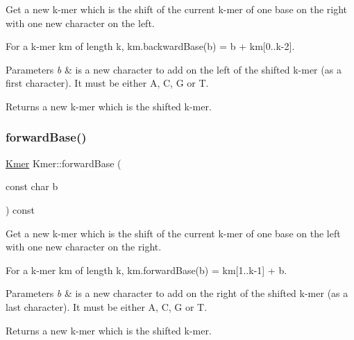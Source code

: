 Get a new k-\/mer which is the shift of the current k-\/mer of one base on the right with one new character on the left. 

For a k-\/mer km of length k, km.\+backward\+Base(b) = b + km\mbox{[}0..k-\/2\mbox{]}. 
\begin{DoxyParams}{Parameters}
{\em b} & is a new character to add on the left of the shifted k-\/mer (as a first character). It must be either \textquotesingle{}A\textquotesingle{}, \textquotesingle{}C\textquotesingle{}, \textquotesingle{}G\textquotesingle{} or \textquotesingle{}T\textquotesingle{}. \\
\hline
\end{DoxyParams}
\begin{DoxyReturn}{Returns}
a new k-\/mer which is the shifted k-\/mer. 
\end{DoxyReturn}
\mbox{\label{classKmer_ad21155c7aa0e25973bc8c95047cee78d}} 
\subsubsection{\texorpdfstring{forward\+Base()}{forwardBase()}}
{\footnotesize\ttfamily \hyperlink{classKmer}{Kmer} Kmer\+::forward\+Base (\begin{DoxyParamCaption}\item[{const char}]{b }\end{DoxyParamCaption}) const}



Get a new k-\/mer which is the shift of the current k-\/mer of one base on the left with one new character on the right. 

For a k-\/mer km of length k, km.\+forward\+Base(b) = km\mbox{[}1..k-\/1\mbox{]} + b. 
\begin{DoxyParams}{Parameters}
{\em b} & is a new character to add on the right of the shifted k-\/mer (as a last character). It must be either \textquotesingle{}A\textquotesingle{}, \textquotesingle{}C\textquotesingle{}, \textquotesingle{}G\textquotesingle{} or \textquotesingle{}T\textquotesingle{}. \\
\hline
\end{DoxyParams}
\begin{DoxyReturn}{Returns}
a new k-\/mer which is the shifted k-\/mer. 
\end{DoxyReturn}
\mbox{\label{classKmer_af23c636ad07801e49b09565513da451c}} 
